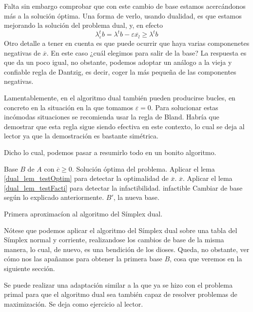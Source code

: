 Falta sin embargo comprobar que con este cambio de base estamos acercándonos más a la solución óptima. Una forma de verlo, usando dualidad, es que estamos mejorando la solución del problema dual, y, en efecto
\begin{equation*}
	\lambda_\varepsilon^tb=\lambda^tb-\varepsilon\overline{x_l}\geq \lambda^tb
\end{equation*}
Otro detalle a tener en cuenta es que puede ocurrir que haya varias componenetes negativas de $\overline{x}$. En este caso ¿cuál elegimos para salir de la base? La respuesta es que da un poco igual, no obstante, podemos adoptar un análogo a la vieja y confiable regla de Dantzig, es decir, coger la más pequeña de las componentes negativas.
\begin{obs}[Bucles]
	Lamentablemente, en el algoritmo dual también pueden producirse bucles, en concreto en la situación en la que tomamos $\varepsilon=0$. Para solucionar estas incómodas situaciones se recomienda usar la regla de Bland. Habría que demostrar que esta regla sigue siendo efectiva en este contexto, lo cual se deja al lector ya que la demostración es bastante simétrica.
\end{obs}
Dicho lo cual, podemos pasar a resumirlo todo en un bonito algoritmo.
\begin{algorithm}[H]
	\begin{algorithmic}[1]
		\REQUIRE Base $B$ de $A$ con $\overline{c}\geq 0$.
		\ENSURE Solución óptima del problema.
		\STATE Aplicar el lema \ref{dual_lem_testOptim} para detectar la optimalidad de $\overline{x}$.
		\RETURN $\overline{x}$.
		\ELSE 
		\STATE Aplicar el lema \ref{dual_lem_testFacti} para detectar la infactibilidad.
		\RETURN infactible
		\ELSE
		\STATE Cambiar de base según lo explicado anteriormente.
		\RETURN $B'$, la nueva base.
		\ENDIF
		\ENDIF	
	\end{algorithmic}
	\caption{Primera aproximacíon al algoritmo del Símplex dual.}\label{dual_alg_dual}
\end{algorithm}
Nótese que podemos aplicar el algoritmo del Símplex dual sobre una tabla del Símplex normal y corriente, realizandose los cambios de base de la misma manera, lo cual, de nuevo, es una bendición de los dioses. Queda, no obstante, ver cómo nos las apañamos para obtener la primera base $B$, cosa que veremos en la siguiente sección.
\begin{obs}[Maximización]
	Se puede realizar una adaptación similar a la que ya se hizo con el problema primal para que el algoritmo dual sea también capaz de resolver problemas de maximización. Se deja como ejercicio al lector.
\end{obs}
